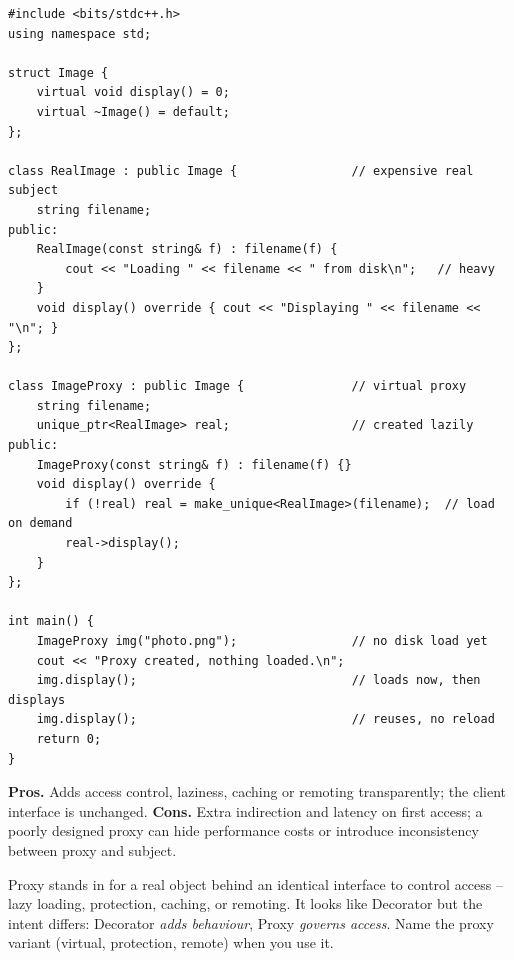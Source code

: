 \begin{lstlisting}
#include <bits/stdc++.h>
using namespace std;

struct Image {
    virtual void display() = 0;
    virtual ~Image() = default;
};

class RealImage : public Image {                // expensive real subject
    string filename;
public:
    RealImage(const string& f) : filename(f) {
        cout << "Loading " << filename << " from disk\n";   // heavy
    }
    void display() override { cout << "Displaying " << filename << "\n"; }
};

class ImageProxy : public Image {               // virtual proxy
    string filename;
    unique_ptr<RealImage> real;                 // created lazily
public:
    ImageProxy(const string& f) : filename(f) {}
    void display() override {
        if (!real) real = make_unique<RealImage>(filename);  // load on demand
        real->display();
    }
};

int main() {
    ImageProxy img("photo.png");                // no disk load yet
    cout << "Proxy created, nothing loaded.\n";
    img.display();                              // loads now, then displays
    img.display();                              // reuses, no reload
    return 0;
}
\end{lstlisting}

\begin{complexitybox}
\textbf{Pros.} Adds access control, laziness, caching or remoting
transparently; the client interface is unchanged. \textbf{Cons.} Extra
indirection and latency on first access; a poorly designed proxy can hide
performance costs or introduce inconsistency between proxy and subject.
\end{complexitybox}

\begin{takeawaybox}
Proxy stands in for a real object behind an identical interface to control
access -- lazy loading, protection, caching, or remoting. It looks like
Decorator but the intent differs: Decorator \emph{adds behaviour}, Proxy
\emph{governs access}. Name the proxy variant (virtual, protection,
remote) when you use it.
\end{takeawaybox}
